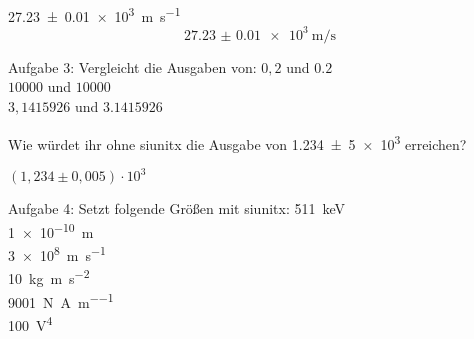 \maketitle
\tableofcontents
\newpage

\SI{27.23(1)e3}{\meter\per\second}
\begin{equation}
  \SI{27.23(1)e3}{\meter\per\second}
\end{equation}

Aufgabe 3:
  Vergleicht die Ausgaben von:
    $0,2$ und $\num{0,2}$ \\
    $10000$ und $\num{10000}$\\
    $3,1415926$ und $\num{3,1415926}$

  Wie würdet ihr ohne siunitx die Ausgabe von
    \num{1,234(5)e3}
  erreichen?

$(1{,}234 \pm 0{,}005) \cdot 10^3$

Aufgabe 4:
  Setzt folgende Größen mit siunitx:
    \SI{511} {\kilo\electronvolt} \\
    \SI{1e-10} {\meter} \\
    \SI{3e8} {\meter\per\second} \\
    \SI{10} {\kilo\gram\meter\per\second\squared} \\
    \SI{9001} {\newton\per\ampere\per\meter} \\
    \SI{100} {\volt\tothe{4}} \\
